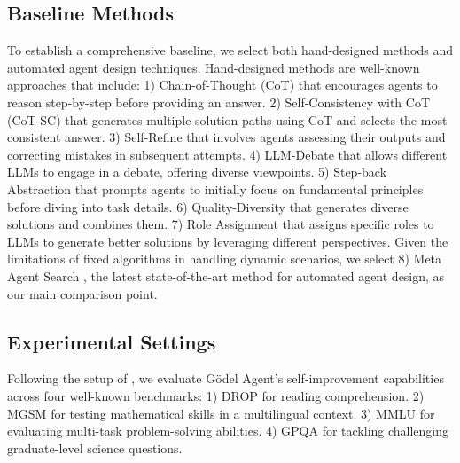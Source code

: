\documentclass[11pt]{article}
\newcommand{\framework}{Gödel Agent\xspace}
\begin{document}
\subsection{Baseline Methods}
To establish a comprehensive baseline, we select both hand-designed methods and automated agent design techniques. Hand-designed methods are well-known approaches that include:
1) Chain-of-Thought (CoT) \citep{wei2022chain} that encourages agents to reason step-by-step before providing an answer.
2) Self-Consistency with CoT (CoT-SC) \citep{wang2023selfconsistencyimproveschainthought} that generates multiple solution paths using CoT and selects the most consistent answer.
3) Self-Refine \citep{madaan2024self} that involves agents assessing their outputs and correcting mistakes in subsequent attempts.
4) LLM-Debate \citep{du2023improvingfactualityreasoninglanguage} that allows different LLMs to engage in a debate, offering diverse viewpoints.
5) Step-back Abstraction \citep{zheng2024stepbackevokingreasoning} that prompts agents to initially focus on fundamental principles before diving into task details.
6) Quality-Diversity \citep{lu2024aiscientistfullyautomated} that generates diverse solutions and combines them.
7) Role Assignment \citep{xu2023expertpromptinginstructinglargelanguage} that assigns specific roles to LLMs to generate better solutions by leveraging different perspectives.
Given the limitations of fixed algorithms in handling dynamic scenarios, we select 8) Meta Agent Search \citep{hu2024automated}, the latest state-of-the-art method for automated agent design, as our main comparison point. 

\subsection{Experimental Settings}
Following the setup of \citet{hu2024automated}, we evaluate \framework's self-improvement capabilities across four well-known benchmarks:
1) DROP \citep{dua2019dropreadingcomprehensionbenchmark} for reading comprehension.
2) MGSM \citep{shi2022languagemodelsmultilingualchainofthought} for testing mathematical skills in a multilingual context.
3) MMLU \citep{hendrycks2021measuringmassivemultitasklanguage} for evaluating multi-task problem-solving abilities.
4) GPQA \citep{rein2023gpqagraduatelevelgoogleproofqa} for tackling challenging graduate-level science questions.
\end{document}
